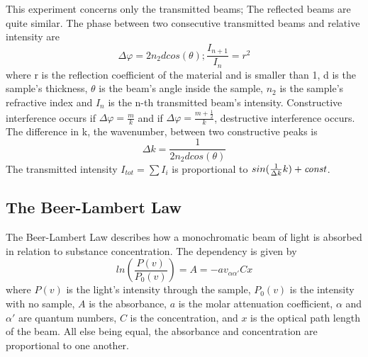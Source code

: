 \documentclass[reprint,amsmath,amssymb,aps, prl]{revtex4-2}
\begin{document}
This experiment concerns only the transmitted beams; The reflected beams are quite similar. The phase between two consecutive transmitted beams and relative intensity are
\begin{equation} \label{eq:ThinPhaseAmp}
\Delta\varphi=2n_{2}dcos(\theta);\frac{I_{n+1}}{I_{n}}=r^{2}
\end{equation}
where r is the reflection coefficient of the material and is smaller than 1, d is the sample's thickness, $\theta$ is the beam's angle inside the sample, $n_{2}$ is the sample's refractive index and $I_{n}$ is the n-th transmitted beam's intensity. Constructive interference occurs if $\Delta\varphi=\frac{m}{k}$ and if $\Delta\varphi=\frac{m+\frac{1}{2}}{k}$, destructive interference occurs. The difference in k, the wavenumber, between two constructive peaks is 
\begin{equation} \label{eq:ThinDiffWavenum}
\Delta k=\frac{1}{2n_{2}dcos(\theta)}
\end{equation} 
The transmitted intensity $I_{tot}=\sum I_{i}$ is proportional to $sin(\frac{1}{\Delta k}k)+{\it const}$.


\subsection{The Beer-Lambert Law}
The Beer-Lambert Law describes how a monochromatic beam of light is absorbed in relation to substance concentration. The dependency is given by
\begin{equation} \label{eq:BeerLambert}
ln\left(\frac{P(v)}{P_{0}(v)}\right)=A=-av_{\alpha\alpha'}Cx
\end{equation}
where $P(v)$ is the light's intensity through the sample, $P_{0}(v)$ is the intensity with no sample, $A$ is the absorbance, $a$ is the molar attenuation coefficient, $\alpha$ and $\alpha'$ are quantum numbers, $C$ is the concentration, and $x$ is the optical path length of the beam. All else being equal, the absorbance and concentration are proportional to one another.
\end{document}
